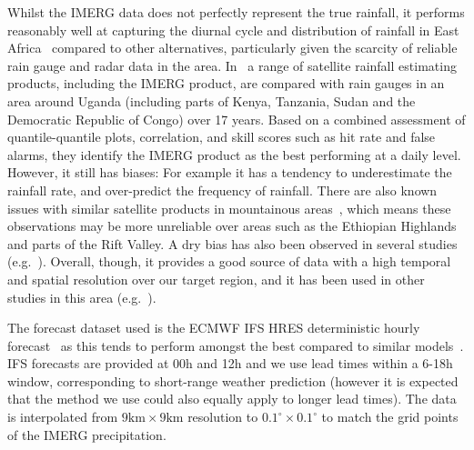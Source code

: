 \documentclass{article}
\begin{document}
Whilst the IMERG data does not perfectly represent the true rainfall, it performs reasonably well at capturing the diurnal cycle and distribution of rainfall in East Africa~\citep{dezfuli_validation_2017, roca_comparing_2010, camberlin_major_2018} compared to other alternatives, particularly given the scarcity of reliable rain gauge and radar data in the area.  In~\cite{ageet_validation_2022} a range of satellite rainfall estimating products, including the IMERG product, are compared with rain gauges in an area around Uganda (including parts of Kenya, Tanzania, Sudan and the Democratic Republic of Congo) over 17 years. Based on a combined assessment of quantile-quantile plots, correlation, and skill scores such as hit rate and false alarms, they identify the IMERG product as the best performing at a daily level. However, it still has biases: For example it has a tendency to underestimate the rainfall rate, and over-predict the frequency of rainfall. There are also known issues with similar satellite products in mountainous areas~\citep{dinku_comparison_2010}, which means these observations may be more unreliable over areas such as the Ethiopian Highlands and parts of the Rift Valley. A dry bias has also been observed in several studies (e.g.~\cite{vogel_skill_2018}). Overall, though, it provides a good source of data with a high temporal and spatial resolution over our target region, and it has been used in other studies in this area (e.g.~\cite{woodhams_what_2018, finney_implications_2019, cafaro_convection-permitting_2021}).

The forecast dataset used is the ECMWF IFS HRES deterministic hourly forecast~\citep{ecmwf_operational_2023} as this tends to perform amongst the best compared to similar models~\citep{haiden_intercomparison_2012}. IFS forecasts are provided at 00h and 12h and we use lead times within a 6-18h window, corresponding to short-range weather prediction (however it is expected that the method we use could also equally apply to longer lead times). The data is interpolated from $9\text{km} \times 9\text{km}$ resolution to $0.1^{\circ} \times 0.1^{\circ}$ to match the grid points of the IMERG precipitation.
\end{document}
